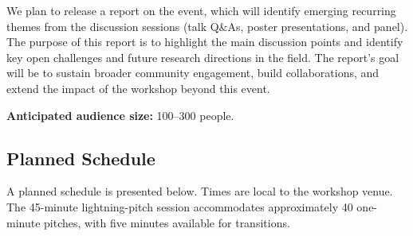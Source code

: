\documentclass[11pt]{article}
\begin{document}
We plan to release a report on the event, which will identify emerging recurring themes from the discussion sessions (talk Q\&As, poster presentations, and panel). The purpose of this report is to highlight the main discussion points and identify key open challenges and future research directions in the field. The report's goal will be to sustain broader community engagement, build collaborations, and extend the impact of the workshop beyond this event.


\textbf{Anticipated audience size:} 100--300 people.


\subsection{Planned Schedule}

A planned schedule is presented below. Times are local to the workshop venue. The 45-minute lightning-pitch session accommodates approximately 40 one-minute pitches, with five minutes available for transitions.
\end{document}
